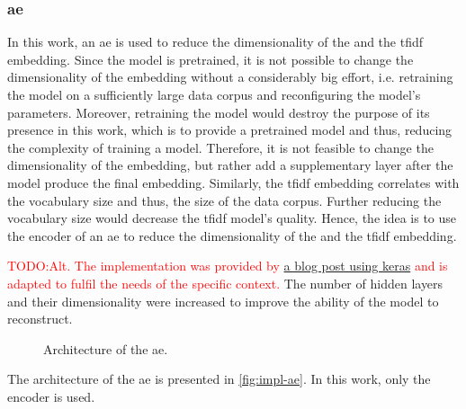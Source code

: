 \subsubsection*{\acl{ae}}\label{subsubsec:impl-autoencoder}

In this work, an \ac{ae} is used to reduce the dimensionality of the \infersent{} and the \ac{tfidf} embedding.
Since the \infersent{} model is pretrained, it is not possible to change the dimensionality of the embedding without a considerably big effort,
i.e. retraining the model on a sufficiently large data corpus and reconfiguring the model's parameters.
Moreover, retraining the model would destroy the purpose of its presence in this work, which is to provide a pretrained model and thus, 
reducing the complexity of training a model.
Therefore, it is not feasible to change the dimensionality of the \infersent{} embedding, but rather add a supplementary layer after the model 
produce the final embedding.
Similarly, the \ac{tfidf} embedding correlates with the vocabulary size and thus, the size of the data corpus.
Further reducing the vocabulary size would decrease the \ac{tfidf} model's quality.
Hence, the idea is to use the encoder of an \ac{ae} to reduce the dimensionality of the \infersent{} and the \ac{tfidf} embedding.

\textcolor{red}{TODO:Alt. The implementation was provided by 
\href{https://blog.paperspace.com/autoencoder-image-compression-keras/}{a blog post using keras}
and is adapted to fulfil the needs of the specific context.
}
The number of hidden layers and their dimensionality were increased to improve the ability of the model to reconstruct.
%     

\begin{figure}[h] %
    \centering
    
    \caption[Architecture of the \ac{ae}]{Architecture of the \ac{ae}.}
    \label{fig:impl-ae}
\end{figure}

The architecture of the \ac{ae} is presented in \autoref{fig:impl-ae}.
In this work, only the encoder is used.